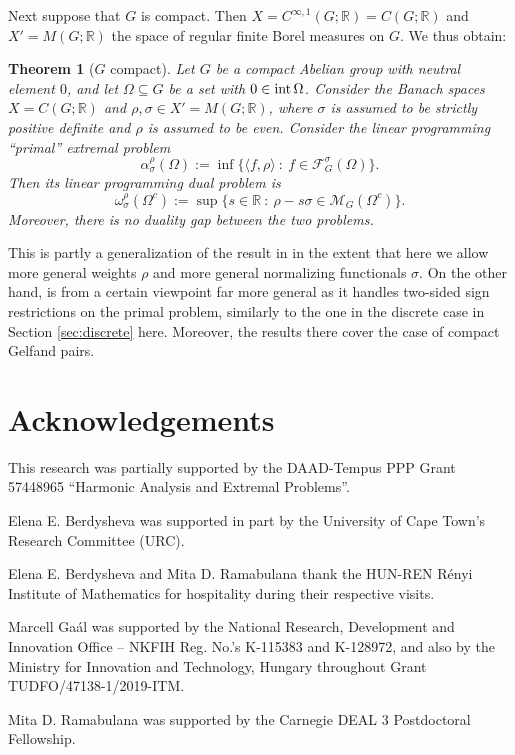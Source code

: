 \documentclass[[a4paper,english,12pt]{amsart}
\theoremstyle{plain}
\newtheorem{theorem}{Theorem}[section]
\theoremstyle{remark}
\newcommand{\intt}{\mbox{\rm int\,}}
\newcommand{\FF}{\mathcal{F}}
\newcommand{\MM}{\mathcal{M}}
\newcommand{\RR}{\mathbb R}
\newcommand{\si}{\sigma}
\newcommand{\rh}{\rho}
\begin{document}
Next suppose that $G$ is compact.
Then $X=C^{\infty,1}(G;\RR)=C(G;\RR)$ and $X'=M(G;\RR)$ the space of regular finite Borel measures on $G$. We thus obtain:
\begin{theorem}[$G$ compact] Let $G$ be a compact Abelian group with neutral element $0$, and let $\Omega \subseteq G$ be a set with $0\in \intt\Omega$. Consider the Banach spaces $X=C(G;\RR)$ and  $\rh,\si\in X'=M(G;\RR)$, where  $\si$ is assumed to be  strictly positive definite  and $\rh$ is assumed to be even.
Consider the linear programming ``primal'' extremal problem
\[
\alpha_\si^\rh (\Omega):= \inf \{\langle f,\rh\rangle~:~f \in \FF_G^\si(\Omega)\}.
\]
Then its linear programming dual problem is
\[
\omega_\si^\rh(\Omega^c):= \sup \{ s \in \RR ~:~\rh- s \si  \in \MM_G(\Omega^c) \}.
\]
Moreover, there is no duality gap between the two problems.
\end{theorem}
This is partly a generalization of the result in \cite{UFO} in the extent that here we allow more general weights $\rh$ and more general normalizing functionals $\si$. On the other hand, \cite{UFO} is from a certain viewpoint far more general as it handles two-sided sign restrictions on the primal problem, similarly to the one in the discrete case in Section \ref{sec:discrete} here. Moreover, the results there cover the case of compact Gelfand pairs.


\section*{Acknowledgements}%


This research was partially supported by the DAAD-Tempus PPP Grant 57448965 ``Harmonic Analysis and Extremal Problems''.

Elena E. Berdysheva was supported  in part by the University of Cape Town's Research Committee (URC).

Elena E. Berdysheva and Mita D. Ramabulana thank the HUN-REN R\'enyi Institute of Mathematics for hospitality during their respective visits.


Marcell Ga\'al was supported by the National Research, Development and Innovation Office -- NKFIH Reg. No.'s K-115383 and K-128972, and also by the Ministry for Innovation and Technology, Hungary throughout Grant TUDFO/47138-1/2019-ITM.

Mita D. Ramabulana was supported by the Carnegie DEAL 3 Postdoctoral Fellowship.
\end{document}
